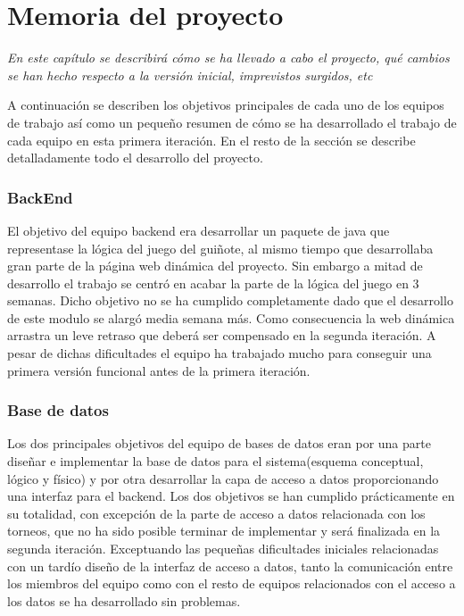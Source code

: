 \section{Memoria del proyecto}
\label{memoria}
\emph{En este capítulo se describirá cómo se ha llevado a cabo el proyecto, qué cambios se han hecho respecto a la versión inicial, imprevistos surgidos, etc}

A continuación se describen los objetivos principales de cada uno de los equipos de trabajo así como un pequeño resumen de cómo se ha desarrollado el trabajo de cada equipo en esta primera iteración. En el resto de la sección se describe detalladamente todo el desarrollo del proyecto.\\
\subsubsection*{BackEnd}
El objetivo del equipo backend era desarrollar un paquete de java que representase la lógica del juego del guiñote, al mismo tiempo que desarrollaba gran parte de la página web dinámica del proyecto. Sin embargo a mitad de desarrollo el trabajo se centró en acabar la parte de la lógica del juego en 3 semanas. Dicho objetivo no se ha cumplido completamente dado que el desarrollo de este modulo se alargó media semana más. Como consecuencia la web dinámica arrastra un leve retraso que deberá ser compensado en la segunda iteración. A pesar de dichas dificultades el equipo ha trabajado mucho para conseguir una primera versión funcional antes de la primera iteración.

\subsubsection*{Base de datos}
Los dos principales objetivos del equipo de bases de datos eran por una parte diseñar e implementar la base de datos para el sistema(esquema conceptual, lógico y físico) y por otra desarrollar la capa de acceso a datos proporcionando una interfaz para el backend. Los dos objetivos se han cumplido prácticamente en su totalidad, con excepción de la parte de acceso a datos relacionada con los torneos, que no ha sido posible terminar de implementar y será finalizada en la segunda iteración. Exceptuando las pequeñas dificultades iniciales relacionadas con un tardío diseño de la interfaz de acceso a datos, tanto la comunicación entre los miembros del equipo como con el resto de equipos relacionados con el acceso a los datos se ha desarrollado sin problemas.

